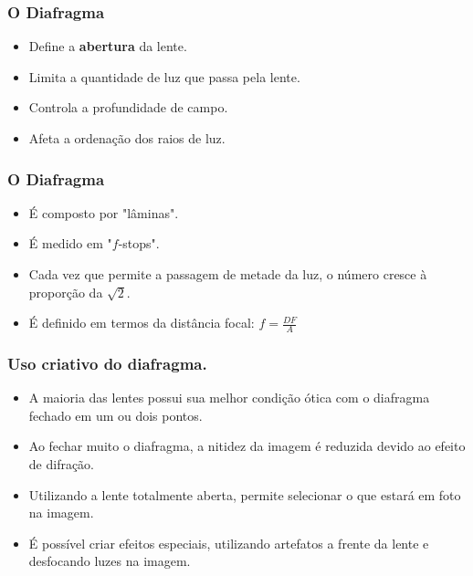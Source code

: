 
\begin{frame}
    \frametitle{O Diafragma}
    \begin{itemize}
        \item Define a \textbf{abertura} da lente.
        \item Limita a quantidade de luz que passa pela lente.
        \item Controla a profundidade de campo.
        \item Afeta a ordenação dos raios de luz.
    \end{itemize}
\end{frame}

\begin{frame}
    \frametitle{O Diafragma}
    \begin{itemize}
        \item É composto por "lâminas".
        \item É medido em "$f$-stops".
        \item Cada vez que permite a passagem de metade da luz, o número
              cresce à proporção da $\sqrt{2}$.
        \item É definido em termos da distância focal: $f=\frac{DF}{A}$
    \end{itemize}
\end{frame}


\begin{frame}
    \frametitle{Uso criativo do diafragma.}
    \begin{itemize}
        \item A maioria das lentes possui sua melhor condição ótica com o diafragma fechado em um ou dois pontos.
        \item Ao fechar muito o diafragma, a nitidez da imagem é reduzida devido ao efeito de difração.
        \item Utilizando a lente totalmente aberta, permite selecionar o que estará em foto na imagem.
        \item É possível criar efeitos especiais, utilizando artefatos a frente da lente e desfocando
        luzes na imagem.
    \end{itemize}
\end{frame}

